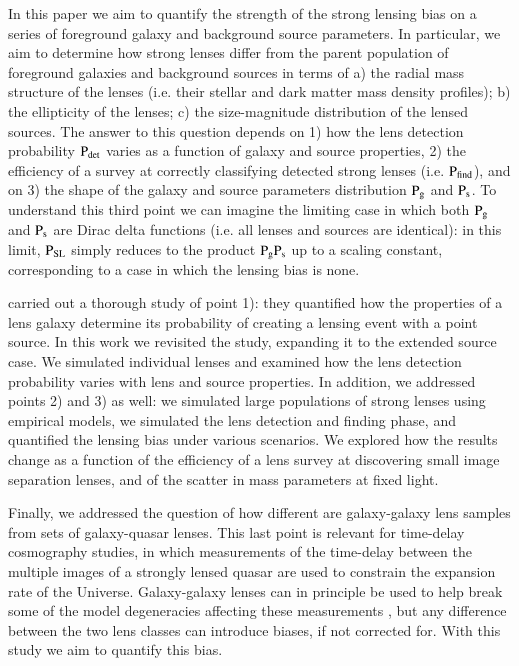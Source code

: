 \documentclass{aa}
\def\prlens{{\rm P}_\mathrm{g}}
\def\prsource{{\rm P}_\mathrm{s}}
\def\prsl{{\rm P}_\mathrm{{SL}}}
\def\pdet{{\rm P}_\mathrm{det}}
\def\pfind{{\rm P}_\mathrm{find}}
\begin{document}
In this paper we aim to quantify the strength of the strong lensing bias on a series of foreground galaxy and background source parameters. 
In particular, we aim to determine how strong lenses differ from the parent population of foreground galaxies and background sources in terms of a) the radial mass structure of the lenses (i.e. their stellar and dark matter mass density profiles); b) the ellipticity of the lenses; c) the size-magnitude distribution of the lensed sources.
The answer to this question depends on 1) how the lens detection probability $\pdet$ varies as a function of galaxy and source properties, 2) the efficiency of a survey at correctly classifying detected strong lenses (i.e. $\pfind$), and on 3) the shape of the galaxy and source parameters distribution $\prlens$ and $\prsource$. To understand this third point we can imagine the limiting case in which both $\prlens$ and $\prsource$ are Dirac delta functions (i.e. all lenses and sources are identical): in this limit, $\prsl$ simply reduces to the product $\prlens\prsource$ up to a scaling constant, corresponding to a case in which the lensing bias is none.

\citet{MVK09} carried out a thorough study of point 1): they quantified how the properties of a lens galaxy determine its probability of creating a lensing event with a point source.
In this work we revisited the \citet{MVK09} study, expanding it to the extended source case. We simulated individual lenses and examined how the lens detection probability varies with lens and source properties.
In addition, we addressed points 2) and 3) as well: we simulated large populations of strong lenses using empirical models, we simulated the lens detection and finding phase, and quantified the lensing bias under various scenarios.
We explored how the results change as a function of the efficiency of a lens survey at discovering small image separation lenses, and of the scatter in mass parameters at fixed light.

Finally, we addressed the question of how different are galaxy-galaxy lens samples from sets of galaxy-quasar lenses. This last point is relevant for time-delay cosmography studies, in which measurements of the time-delay between the multiple images of a strongly lensed quasar are used to constrain the expansion rate of the Universe. Galaxy-galaxy lenses can in principle be used to help break some of the model degeneracies affecting these measurements \citep{B+T21}, but any difference between the two lens classes can introduce biases, if not corrected for.
With this study we aim to quantify this bias.
\end{document}
